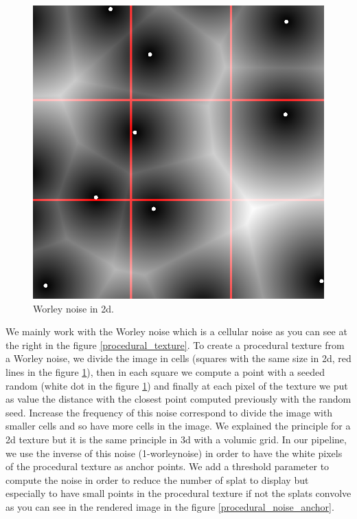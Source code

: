 
\begin{figure}[H]
    \begin{center}
    \includegraphics[scale=0.2]{images/noise/worley_explain.png}
    \end{center}
    \caption{Worley noise in 2d.}
    \label{worley_explain}
\end{figure}

We mainly work with the Worley noise which is a cellular noise as you can see at the right in the figure \ref{procedural_texture}. To create a procedural texture from a Worley noise, we divide the image in cells (squares with the same size in 2d, red lines in the figure \ref{worley_explain}), then in each square we compute a point with a seeded random (white dot in the figure \ref{worley_explain}) and finally at each pixel of the texture we put as value the distance with the closest point computed previously with the random seed. Increase the frequency of this noise correspond to divide the image with smaller cells and so have more cells in the image. We explained the principle for a 2d texture but it is the same principle in 3d with a volumic grid. In our pipeline, we use the inverse of this noise (1-worleynoise) in order to have the white pixels of the procedural texture as anchor points. We add a threshold parameter to compute the noise in order to reduce the number of splat to display but especially to have small points in the procedural texture if not the splats convolve as you can see in the rendered image in the figure \ref{procedural_noise_anchor}.

